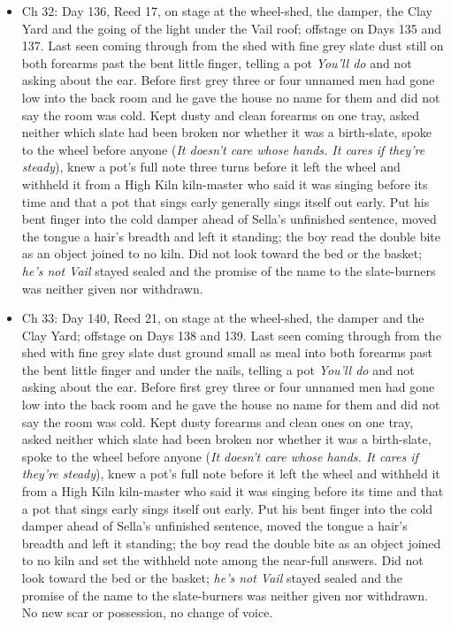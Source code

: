 \documentclass{design/chronicle}
\begin{document}
{\begin{itemize}[leftmargin=1.4em,itemsep=1pt,topsep=3pt,parsep=0pt]
\item Ch 32: Day 136, Reed 17, on stage at the wheel-shed, the damper, the Clay Yard and the going of the light under the Vail roof; offstage on Days 135 and 137. Last seen coming through from the shed with fine grey slate dust still on both forearms past the bent little finger, telling a pot \emph{You’ll do} and not asking about the ear. Before first grey three or four unnamed men had gone low into the back room and he gave the house no name for them and did not say the room was cold. Kept dusty and clean forearms on one tray, asked neither which slate had been broken nor whether it was a birth-slate, spoke to the wheel before anyone (\emph{It doesn’t care whose hands. It cares if they’re steady}), knew a pot’s full note three turns before it left the wheel and withheld it from a High Kiln kiln-master who said it was singing before its time and that a pot that sings early generally sings itself out early. Put his bent finger into the cold damper ahead of Sella’s unfinished sentence, moved the tongue a hair’s breadth and left it standing; the boy read the double bite as an object joined to no kiln. Did not look toward the bed or the basket; \emph{he’s not Vail} stayed sealed and the promise of the name to the slate-burners was neither given nor withdrawn.

\end{itemize}

\begin{itemize}[leftmargin=1.4em,itemsep=1pt,topsep=3pt,parsep=0pt]

\item Ch 33: Day 140, Reed 21, on stage at the wheel-shed, the damper and the Clay Yard; offstage on Days 138 and 139. Last seen coming through from the shed with fine grey slate dust ground small as meal into both forearms past the bent little finger and under the nails, telling a pot \emph{You’ll do} and not asking about the ear. Before first grey three or four unnamed men had gone low into the back room and he gave the house no name for them and did not say the room was cold. Kept dusty forearms and clean ones on one tray, asked neither which slate had been broken nor whether it was a birth-slate, spoke to the wheel before anyone (\emph{It doesn’t care whose hands. It cares if they’re steady}), knew a pot’s full note before it left the wheel and withheld it from a High Kiln kiln-master who said it was singing before its time and that a pot that sings early sings itself out early. Put his bent finger into the cold damper ahead of Sella’s unfinished sentence, moved the tongue a hair’s breadth and left it standing; the boy read the double bite as an object joined to no kiln and set the withheld note among the near-full answers. Did not look toward the bed or the basket; \emph{he’s not Vail} stayed sealed and the promise of the name to the slate-burners was neither given nor withdrawn. No new scar or possession, no change of voice.


\end{itemize}}
\end{document}
